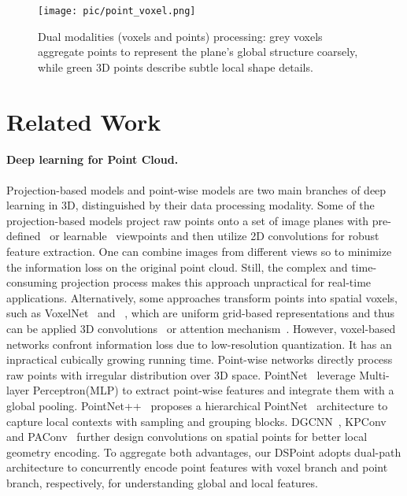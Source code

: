 \documentclass[sigconf]{acmart}
\begin{document}
\begin{figure}[t]
  \centering
\texttt{[image: pic/point\_voxel.png]}
  \caption{Dual modalities (voxels and points) processing: grey voxels aggregate points to represent the plane's global structure coarsely, while green 3D points describe subtle local shape details.}
    \label{fig:point_voxel}
    \vspace{-0.5cm}
\end{figure}


\section{Related Work}
\label{sec:related work}

\paragraph{Deep learning for Point Cloud.}
Projection-based models and point-wise models are two main branches of deep learning in 3D, distinguished by their data processing modality. Some of the projection-based models project raw points onto a set of image planes with pre-defined~\cite{su2015multi} or learnable~\cite{kanezaki2018rotationnet} viewpoints and then utilize 2D convolutions for robust feature extraction.  One can combine images from different views so to minimize the information loss on the original point cloud. Still, the complex and time-consuming projection process makes this approach unpractical for real-time applications. Alternatively, some approaches transform points into spatial voxels, such as VoxelNet~\cite{zhou2018voxelnet} and ~\cite{su2018splatnet,riegler2017octnet}, which are uniform grid-based representations and thus can be applied 3D convolutions~\cite{maturana2015voxnet} or attention mechanism~\cite{bahdanau2014neural}. However, voxel-based networks confront information loss due to low-resolution quantization.  It has an inpractical cubically growing running time. Point-wise networks directly process raw points with irregular distribution over 3D space. PointNet~\cite{qi2017pointnet} leverage Multi-layer Perceptron(MLP) to extract point-wise features and integrate them with a global pooling. PointNet++~\cite{qi2017pointnet++} proposes a hierarchical PointNet~\cite{qi2017pointnet} architecture to capture local contexts with sampling and grouping blocks. DGCNN~\cite{wang2019dynamic}, KPConv~\cite{thomas2019kpconv} and PAConv~\cite{xu2021paconv} further design convolutions on spatial points for better local geometry encoding. To aggregate both advantages, our DSPoint adopts dual-path architecture to concurrently encode point features with voxel branch and point branch, respectively, for understanding global and local features.
\end{document}
